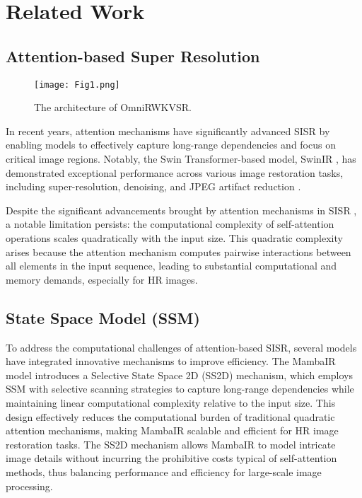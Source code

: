 \section{Related Work}
\subsection{Attention-based Super Resolution}
\begin{figure*}[!t]
    \centering
    \texttt{[image: Fig1.png]}
    \caption{The architecture of OmniRWKVSR.}
    \label{arch}
\end{figure*}

In recent years, attention mechanisms have significantly advanced SISR by enabling models to effectively capture long-range dependencies and focus on critical image regions. Notably, the Swin Transformer-based model, SwinIR \cite{swinir}, has demonstrated exceptional performance across various image restoration tasks, including super-resolution, denoising, and JPEG artifact reduction \cite{denoising, JPEGartifactreduction}.


Despite the significant advancements brought by attention mechanisms in SISR \cite{visiontransformer, swinir}, a notable limitation persists: the computational complexity of self-attention operations scales quadratically with the input size. This quadratic complexity arises because the attention mechanism computes pairwise interactions between all elements in the input sequence, leading to substantial computational and memory demands, especially for HR images. 

\subsection{State Space Model (SSM)}

To address the computational challenges of attention-based SISR, several models\cite{swinir, swinfir} have integrated innovative mechanisms to improve efficiency. The MambaIR model\cite{mambair} introduces a Selective State Space 2D (SS2D) mechanism\cite{s4, mamba}, which employs SSM with selective scanning strategies to capture long-range dependencies while maintaining linear computational complexity relative to the input size. This design effectively reduces the computational burden of traditional quadratic attention mechanisms, making MambaIR scalable and efficient for HR image restoration tasks. The SS2D mechanism allows MambaIR to model intricate image details without incurring the prohibitive costs typical of self-attention methods, thus balancing performance and efficiency for large-scale image processing.

